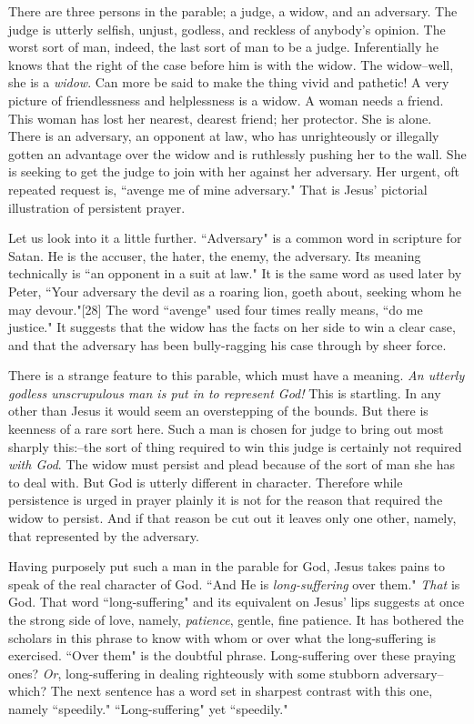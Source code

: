 There are three persons in the parable; a judge, a widow, and an
adversary. The judge is utterly selfish, unjust, godless, and reckless of
anybody's opinion. The worst sort of man, indeed, the last sort of man to
be a judge. Inferentially he knows that the right of the case before him
is with the widow. The widow--well, she is a \textit{widow}. Can more be said to
make the thing vivid and pathetic! A very picture of friendlessness and
helplessness is a widow. A woman needs a friend. This woman has lost her
nearest, dearest friend; her protector. She is alone. There is an
adversary, an opponent at law, who has unrighteously or illegally gotten
an advantage over the widow and is ruthlessly pushing her to the wall. She
is seeking to get the judge to join with her against her adversary. Her
urgent, oft repeated request is, ``avenge me of mine adversary." That is
Jesus' pictorial illustration of persistent prayer.

Let us look into it a little further. ``Adversary" is a common word in
scripture for Satan. He is the accuser, the hater, the enemy, the
adversary. Its meaning technically is ``an opponent in a suit at law." It
is the same word as used later by Peter, ``Your adversary the devil as a
roaring lion, goeth about, seeking whom he may devour."[28] The word
``avenge" used four times really means, ``do me justice." It suggests that
the widow has the facts on her side to win a clear case, and that the
adversary has been bully-ragging his case through by sheer force.

There is a strange feature to this parable, which must have a meaning. \textit{An
utterly godless unscrupulous man is put in to represent God!} This is
startling. In any other than Jesus it would seem an overstepping of the
bounds. But there is keenness of a rare sort here. Such a man is chosen
for judge to bring out most sharply this:--the sort of thing required to
win this judge is certainly not required \textit{with God}. The widow must
persist and plead because of the sort of man she has to deal with. But God
is utterly different in character. Therefore while persistence is urged in
prayer plainly it is not for the reason that required the widow to
persist. And if that reason be cut out it leaves only one other, namely,
that represented by the adversary.

Having purposely put such a man in the parable for God, Jesus takes pains
to speak of the real character of God. ``And He is \textit{long-suffering} over
them." \textit{That} is God. That word ``long-suffering" and its equivalent on
Jesus' lips suggests at once the strong side of love, namely, \textit{patience},
gentle, fine patience. It has bothered the scholars in this phrase to know
with whom or over what the long-suffering is exercised. ``Over them" is the
doubtful phrase. Long-suffering over these praying ones? \textit{Or},
long-suffering in dealing righteously with some stubborn adversary--which?
The next sentence has a word set in sharpest contrast with this one,
namely ``speedily." ``Long-suffering" yet ``speedily."

